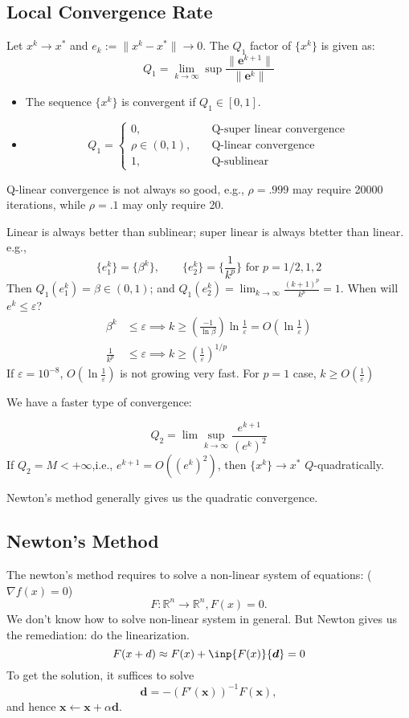 \subsection{Local Convergence Rate}
\begin{definition}[$Q_1$ Factor]
Let $x^k\to x^*$ and $e_k := \|x^k - x^*\|\to0$. The $Q_1$ factor of $\{x^k\}$ is given as:
\[
Q_1 = \lim_{k\to\infty}\sup\frac{\|\bm e^{k+1}\|}{\|\bm e^k\|}
\]
\end{definition}
\begin{itemize}
\item
The sequence $\{x^k\}$ is convergent if $Q_1\in[0,1]$.
\item
\[
Q_1=\left\{
\begin{aligned}
0,&\quad\mbox{Q-super linear convergence}\\
\rho\in(0,1),&\quad\mbox{Q-linear convergence}\\
1,&\quad\mbox{Q-sublinear}
\end{aligned}
\right.
\]
\end{itemize}
\begin{remark}
Q-linear convergence is not always so good, e.g., $\rho=.999$ may require 20000 iterations, while $\rho=.1$ may only require 20.

Linear is always better than sublinear; super linear is always btetter than linear. e.g.,
\[
\{e_1^k\}=\{\beta^k\},\qquad
\{e_2^k\} = \{\frac{1}{k^p}\}\mbox{ for $p=1/2,1,2$}
\]
Then $Q_1(e_1^k)=\beta\in(0,1)$; and $Q_1(e_2^k)=\lim_{k\to\infty}\frac{(k+1)^p}{k^p}=1$. When will $e^k\le\varepsilon$?
\begin{align*}
\beta^k&\le\varepsilon\implies k\ge(\frac{-1}{\ln\beta})\ln\frac{1}{\varepsilon} = O(\ln\frac{1}{\varepsilon})\\
\frac{1}{k^p}&\le\varepsilon\implies
k\ge(\frac{1}{\varepsilon})^{1/p}
\end{align*}
If $\varepsilon=10^{-8}$, $O(\ln\frac{1}{\varepsilon})$ is not growing very fast. For $p=1$ case, $k\ge O(\frac{1}{\varepsilon})$
\end{remark}

We have a faster type of convergence:
\begin{definition}[$Q_2$ Factor]
\[
Q_2 = \lim\sup_{k\to\infty}\frac{e^{k+1}}{(e^k)^2}
\]
If $Q_2=M<+\infty$,i.e., $e^{k+1}=O((e^k)^2)$, then $\{x^k\}\to x^*$ $Q$-quadratically.
\end{definition}
Newton's method generally gives us the quadratic convergence.

\subsection{Newton's Method}
The newton's method requires to solve a non-linear system of equations: ($\nabla f(x)=0$)
\[
F:\mathbb{R}^n\to\mathbb{R}^n, F(x)=0.
\]
We don't know how to solve non-linear system in general. But Newton gives us the remediation: do the linearization. 
\[
F(x+d)\approx F(x)+\inp{F(x)}{\bm d}=0
\]
To get the solution, it suffices to solve
\[
\bm d=-(F'(\bm x))^{-1}F(\bm x),
\]
and hence $\bm x\leftarrow \bm x+\alpha\bm d$.
